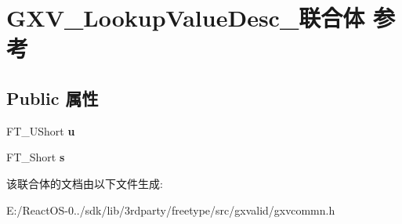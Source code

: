 \hypertarget{union_g_x_v___lookup_value_desc__}{}\section{G\+X\+V\+\_\+\+Lookup\+Value\+Desc\+\_\+联合体 参考}
\label{union_g_x_v___lookup_value_desc__}
\subsection*{Public 属性}
\begin{DoxyCompactItemize}
\item 
\mbox{\label{union_g_x_v___lookup_value_desc___a3aff40b35a59c19716eb99afbac1b7ef}} 
F\+T\+\_\+\+U\+Short {\bfseries u}
\item 
\mbox{\label{union_g_x_v___lookup_value_desc___a46488bb616e648a1fe4c99850948a409}} 
F\+T\+\_\+\+Short {\bfseries s}
\end{DoxyCompactItemize}


该联合体的文档由以下文件生成\+:\begin{DoxyCompactItemize}
\item 
E\+:/\+React\+O\+S-\/0../sdk/lib/3rdparty/freetype/src/gxvalid/gxvcommn.\+h\end{DoxyCompactItemize}
